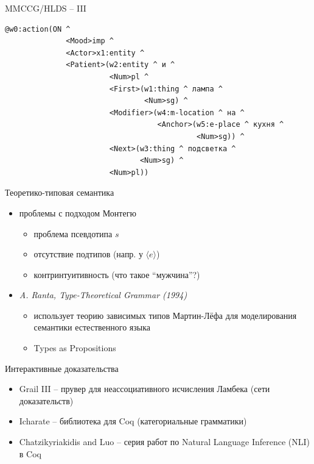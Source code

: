 \documentclass{beamer}
\begin{document}
\begin{frame}[fragile]{MMCCG/HLDS -- III}
\begin{center}
\begin{footnotesize}
\begin{verbatim}
@w0:action(ON ^ 
              <Mood>imp ^ 
              <Actor>x1:entity ^ 
              <Patient>(w2:entity ^ и ^ 
                        <Num>pl ^ 
                        <First>(w1:thing ^ лампа ^ 
                                <Num>sg) ^ 
                        <Modifier>(w4:m-location ^ на ^ 
                                   <Anchor>(w5:e-place ^ кухня ^ 
                                            <Num>sg)) ^ 
                        <Next>(w3:thing ^ подсветка ^ 
                               <Num>sg) ^ 
                        <Num>pl))
\end{verbatim}
\end{footnotesize}
\end{center}
\end{frame} 

\begin{frame}{Теоретико-типовая семантика}
\begin{small}
\begin{itemize}
	\item проблемы с подходом Монтегю
	\begin{itemize}
    		\item проблема псевдотипа $s$
	    \item отсутствие подтипов (напр. у $\langle e \rangle$)
	    	\item контринтуитивность (что такое ``мужчина''?)
	\end{itemize}
	\item \textit{A. Ranta, Type-Theoretical Grammar (1994)}
	\begin{itemize}
    		\item использует теорию зависимых типов Мартин-Лёфа для моделирования семантики естественного языка
	    \item Types as Propositions
	\end{itemize}
\end{itemize}
\end{small}
\end{frame}

\begin{frame}{Интерактивные доказательства}
\begin{small}
\begin{itemize}
	\item Grail III -- прувер для неассоциативного исчисления Ламбека (сети доказательств)
	\item Icharate -- библиотека для Coq (категориальные грамматики)
	\item Chatzikyriakidis and Luo -- серия работ по Natural Language Inference (NLI) в Coq
\end{itemize}
\end{small}
\end{frame}
\end{document}
